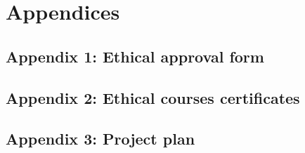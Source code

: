 \section{Appendices}

\subsection{Appendix 1: Ethical approval form}

\newpage

\subsection{Appendix 2: Ethical courses certificates}

\newpage

\subsection{Appendix 3: Project plan}

